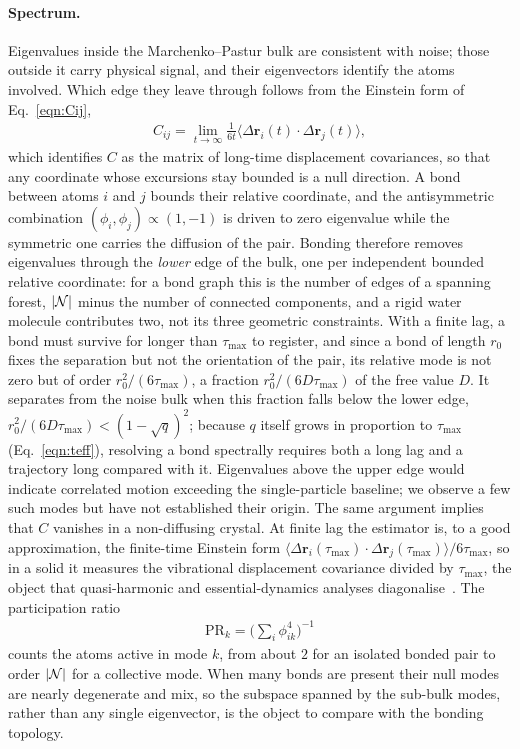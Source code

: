 \paragraph{Spectrum.}
Eigenvalues inside the Marchenko--Pastur bulk are consistent with noise; those outside it carry physical signal, and their eigenvectors identify the atoms involved.
Which edge they leave through follows from the Einstein form of Eq.~\eqref{eqn:Cij},
\begin{align}
    C_{ij} = \lim_{t \to \infty} \frac{1}{6t} \langle \Delta \mathbf{r}_{i}(t) \cdot \Delta \mathbf{r}_{j}(t) \rangle,
    \label{eqn:Cij-einstein}
\end{align}
which identifies $C$ as the matrix of long-time displacement covariances, so that any coordinate whose excursions stay bounded is a null direction.
A bond between atoms $i$ and $j$ bounds their relative coordinate, and the antisymmetric combination $(\phi_{i}, \phi_{j}) \propto (1, -1)$ is driven to zero eigenvalue while the symmetric one carries the diffusion of the pair.
Bonding therefore removes eigenvalues through the \emph{lower} edge of the bulk, one per independent bounded relative coordinate: for a bond graph this is the number of edges of a spanning forest, $|\mathcal{N}|$ minus the number of connected components, and a rigid water molecule contributes two, not its three geometric constraints.
With a finite lag, a bond must survive for longer than $\tau_{\max}$ to register, and since a bond of length $r_{0}$ fixes the separation but not the orientation of the pair, its relative mode is not zero but of order $r_{0}^{2}/(6\tau_{\max})$, a fraction $r_{0}^{2}/(6 D \tau_{\max})$ of the free value $D$.
It separates from the noise bulk when this fraction falls below the lower edge, $r_{0}^{2}/(6 D \tau_{\max}) < (1-\sqrt{q})^{2}$; because $q$ itself grows in proportion to $\tau_{\max}$ (Eq.~\eqref{eqn:teff}), resolving a bond spectrally requires both a long lag and a trajectory long compared with it.
Eigenvalues above the upper edge would indicate correlated motion exceeding the single-particle baseline; we observe a few such modes but have not established their origin.
The same argument implies that $C$ vanishes in a non-diffusing crystal.
At finite lag the estimator is, to a good approximation, the finite-time Einstein form $\langle \Delta \mathbf{r}_{i}(\tau_{\max}) \cdot \Delta \mathbf{r}_{j}(\tau_{\max}) \rangle / 6\tau_{\max}$, so in a solid it measures the vibrational displacement covariance divided by $\tau_{\max}$, the object that quasi-harmonic and essential-dynamics analyses diagonalise~\cite{schlitter1993,amadei1993}.
The participation ratio
\begin{align}
    \mathrm{PR}_{k} = \Big( \sum\nolimits_{i} \phi_{ik}^{4} \Big)^{-1}
    \label{eqn:participation-ratio}
\end{align}
counts the atoms active in mode $k$, from about $2$ for an isolated bonded pair to order $|\mathcal{N}|$ for a collective mode.
When many bonds are present their null modes are nearly degenerate and mix, so the subspace spanned by the sub-bulk modes, rather than any single eigenvector, is the object to compare with the bonding topology.

